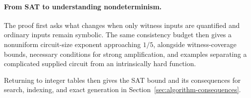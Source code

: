 \paragraph{From SAT to understanding nondeterminism.}
The proof first asks what changes when only witness inputs
are quantified and ordinary inputs remain symbolic. The same
consistency budget then gives a nonuniform circuit-size exponent
approaching $1/5$, alongside witness-coverage bounds, necessary
conditions for strong amplification, and examples separating a
complicated supplied circuit from an intrinsically hard function.

Returning to integer tables then gives the SAT bound and its consequences
for search, indexing, and exact generation in
Section~\ref{sec:algorithm-consequences}.
